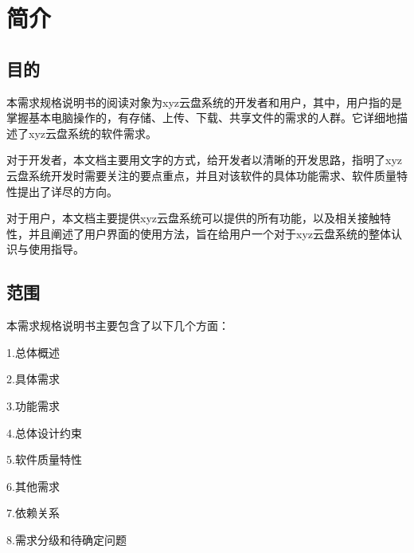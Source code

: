 \chapter{简介}
\section{目的}
本需求规格说明书的阅读对象为xyz云盘系统的开发者和用户，其中，用户指的是掌握基本电脑操作的，有存储、上传、下载、共享文件的需求的人群。它详细地描述了xyz云盘系统的软件需求。

对于开发者，本文档主要用文字的方式，给开发者以清晰的开发思路，指明了xyz云盘系统开发时需要关注的要点重点，并且对该软件的具体功能需求、软件质量特性提出了详尽的方向。

对于用户，本文档主要提供xyz云盘系统可以提供的所有功能，以及相关接触特性，并且阐述了用户界面的使用方法，旨在给用户一个对于xyz云盘系统的整体认识与使用指导。

\section{范围}
本需求规格说明书主要包含了以下几个方面：

1.总体概述

2.具体需求

3.功能需求

4.总体设计约束

5.软件质量特性

6.其他需求

7.依赖关系

8.需求分级和待确定问题